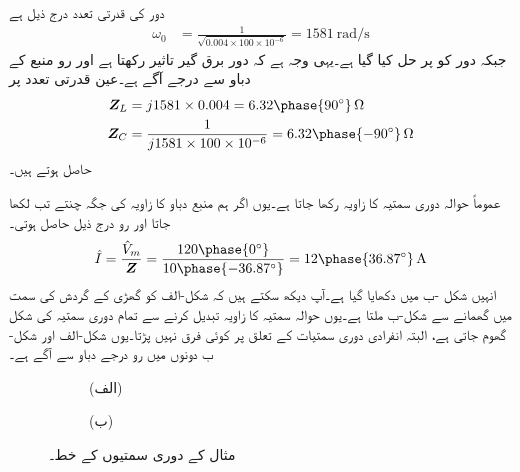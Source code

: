 دور کی قدرتی تعدد درج ذیل ہے
\begin{align*}
\omega_0&=\frac{1}{\sqrt{0.004\times 100 \times 10^{-6}}}=\SI{1581}{\radian\per\second}
\end{align*}
جبکہ دور کو  پر حل کیا گیا ہے۔یہی وجہ ہے کہ دور برق گیر تاثیر رکھتا ہے اور رو منبع کے دباو سے  درجے  آگے ہے۔عین قدرتی تعدد پر
\begin{align*}
\bZ_L&=j1581\times 0.004=6.32\phase{90^{\circ}} \, \si{\ohm}\\
\bZ_C&=\frac{1}{j1581\times 100\times 10^{-6}}=6.32\phase{-90^{\circ}}\,\si{\ohm}
\end{align*}
حاصل ہوتے ہیں۔

عموماً حوالہ دوری سمتیہ کا زاویہ  رکھا جاتا ہے۔یوں اگر ہم منبع دباو کا زاویہ  کی جگہ  چنتے تب  لکھا جاتا اور رو درج ذیل حاصل ہوتی۔
\begin{align*}
\hat{I}=\frac{\hat{V}_m}{\bZ}=\frac{120\phase{0^{\circ}}}{10\phase{-36.87^{\circ}}}=12\phase{36.87^{\circ}}\,\si{\ampere}
\end{align*}
انہیں شکل  -ب میں دکھایا گیا ہے۔آپ دیکھ سکتے ہیں کہ شکل-الف کو  گھڑی کے گردش کی سمت میں  گھمانے سے شکل-ب ملتا ہے۔یوں حوالہ سمتیہ کا زاویہ تبدیل کرنے سے تمام دوری سمتیہ کی شکل گھوم جاتی ہے، البتہ انفرادی دوری سمتیات کے تعلق پر کوئی فرق نہیں پڑتا۔یوں شکل-الف اور شکل-ب دونوں میں رو  درجے دباو سے آگے ہے۔ 
\begin{figure}
\centering
\begin{subfigure}{0.5\textwidth}
\centering
{}
\caption*{(الف)}
\end{subfigure}%
\begin{subfigure}{0.5\textwidth}
\centering
{}
\caption*{(ب)}
\end{subfigure}%
\caption{مثال  کے دوری سمتیوں کے خط۔}
\label{شکل_بدلتا_رو_بالمقابل_دباو}
\end{figure}
